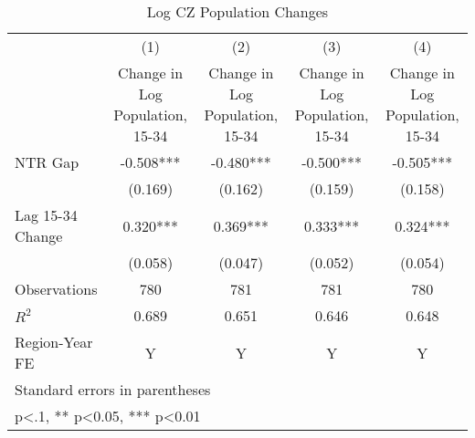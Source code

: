 \begin{table}[htbp]\centering
\def\sym#1{\ifmmode^{#1}\else\(^{#1}\)\fi}
\caption{Log CZ Population Changes}
\begin{tabular}{l*{4}{c}}
\toprule
                    &\multicolumn{1}{c}{(1)}&\multicolumn{1}{c}{(2)}&\multicolumn{1}{c}{(3)}&\multicolumn{1}{c}{(4)}\\
                    &\multicolumn{1}{c}{Change in Log Population, 15-34}&\multicolumn{1}{c}{Change in Log Population, 15-34}&\multicolumn{1}{c}{Change in Log Population, 15-34}&\multicolumn{1}{c}{Change in Log Population, 15-34}\\
\midrule
NTR Gap             &   -0.508***&   -0.480***&   -0.500***&   -0.505***\\
                    &  (0.169)   &  (0.162)   &  (0.159)   &  (0.158)   \\
\addlinespace
Lag 15-34 Change    &    0.320***&    0.369***&    0.333***&    0.324***\\
                    &  (0.058)   &  (0.047)   &  (0.052)   &  (0.054)   \\
\midrule
Observations        &      780   &      781   &      781   &      780   \\
\(R^{2}\)           &    0.689   &    0.651   &    0.646   &    0.648   \\
Region-Year FE      &        Y   &        Y   &        Y   &        Y   \\
\bottomrule
\multicolumn{5}{l}{\footnotesize Standard errors in parentheses}\\
\multicolumn{5}{l}{\footnotesize * p<.1, ** p<0.05, *** p<0.01}\\
\end{tabular}
\end{table}
